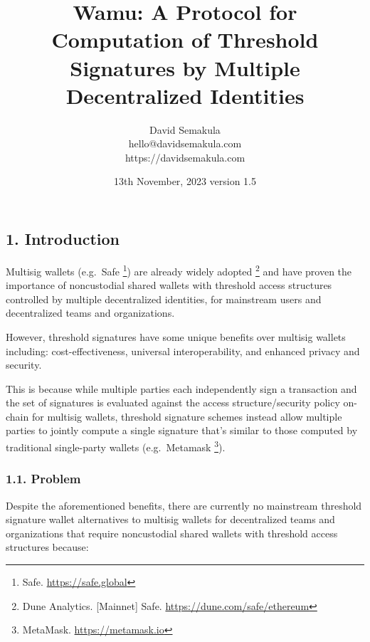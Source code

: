 \documentclass[
]{article}
\title{Wamu: A Protocol for Computation of Threshold Signatures by
Multiple Decentralized Identities}
\author{David Semakula\\
hello@davidsemakula.com\\
https://davidsemakula.com}
\date{13th November, 2023 \textbar{} version 1.5}
\begin{document}
\maketitle

{
\setcounter{tocdepth}{3}
\tableofcontents
}
\hypertarget{introduction}{%
\subsection{1. Introduction}\label{introduction}}

Multisig wallets (e.g.~Safe \footnote{Safe. \url{https://safe.global}})
are already widely adopted \footnote{Dune Analytics. {[}Mainnet{]} Safe.
  \url{https://dune.com/safe/ethereum}} and have proven the importance
of noncustodial shared wallets with threshold access structures
controlled by multiple decentralized identities, for mainstream users
and decentralized teams and organizations.

However, threshold signatures have some unique benefits over multisig
wallets including: cost-effectiveness, universal interoperability, and
enhanced privacy and security.

This is because while multiple parties each independently sign a
transaction and the set of signatures is evaluated against the access
structure/security policy on-chain for multisig wallets, threshold
signature schemes instead allow multiple parties to jointly compute a
single signature that's similar to those computed by traditional
single-party wallets (e.g.~Metamask \footnote{MetaMask.
  \url{https://metamask.io}}).

\hypertarget{problem}{%
\subsubsection{1.1. Problem}\label{problem}}

Despite the aforementioned benefits, there are currently no mainstream
threshold signature wallet alternatives to multisig wallets for
decentralized teams and organizations that require noncustodial shared
wallets with threshold access structures because:
\end{document}

